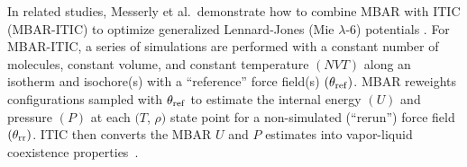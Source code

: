 \documentclass[journal=jced,manuscript=article]{achemso}
\begin{document}

In related studies, Messerly et al.~demonstrate how to combine MBAR with ITIC (MBAR-ITIC) to optimize generalized Lennard-Jones (Mie $\lambda$-6) potentials \cite{Postdoc_1,Postdoc_2}. For MBAR-ITIC, a series of simulations are performed with a constant number of molecules, constant volume, and constant temperature $(NVT)$ along an isotherm and isochore(s) with a ``reference'' force field(s) $(\theta_{\rm ref})$. MBAR reweights configurations sampled with $\theta_{\rm ref}$ to estimate the internal energy $(U)$ and pressure $(P)$ at each $(T$, $\rho)$ state point for a non-simulated 
(``rerun'') force field $(\theta_{\rm rr})$. ITIC then converts the MBAR $U$ and $P$ estimates into vapor-liquid coexistence properties~\cite{Mostafa_Diss,Mostafa2018}.


\end{document}
